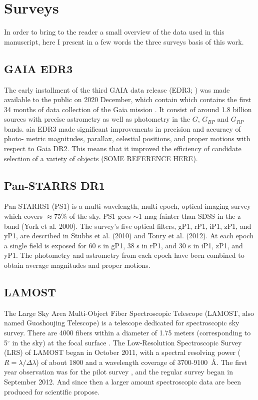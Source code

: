 \documentclass[fleqn,usenatbib]{mnras}
\begin{document}
\section{Surveys}
\label{sec:surveys}

In order to bring to the reader a small overview of the data used
in this manuscript, here I present in a few words the three
surveys basis of this work.

\subsection{GAIA EDR3}
\label{sec:gaia}

The early installment of the third
GAIA data release (EDR3; \citealp{Brown:2021}) was made available to the public
on 2020 December, which contain which contains the first 34 months
of data collection of the Gaia mission \citep{Brown:2018}.
It consist of around 1.8 billion sources
with precise astrometry as well as photometry in
the $G$, $G_{BP}$ and $G_{RP}$ bands. aia EDR3 made
significant improvements in precision and accuracy of photo-
metric magnitudes, parallax, celestial positions, and proper
motions with respect to Gaia DR2. This means that it improved
the efficiency of candidate selection of a variety of
objects (SOME REFERENCE HERE).

\subsection{Pan-STARRS DR1}
\label{sec:PS1}

Pan-STARRS1 (PS1)
is a multi-wavelength, multi-epoch, optical imaging survey
which covers $\approx$75\% of the sky. PS1 goes $\sim$1 mag fainter
than SDSS in the z band (York et al. 2000). The survey’s five optical
filters, gP1, rP1, iP1, zP1, and yP1, are described in Stubbs et al.
(2010) and Tonry et al. (2012). At each epoch a single field
is exposed for 60 s in gP1, 38 s in rP1, and 30 s in iP1, zP1,
and yP1. The photometry and astrometry from each epoch
have been combined to obtain average magnitudes and proper
motions.

\subsection{LAMOST}
\label{sec:lamost}

The Large Sky Area Multi-Object Fiber Spectroscopic Telescope
(LAMOST, also named Guoshoujing Telescope) is a
telescope dedicated for spectroscopic sky survey.
There are 4000 fibers within a diameter of 1.75 meters (corresponding
to 5$^{\circ}$ in the sky) at the focal surface \citep{Cui:2012}.
The Low-Resolution Spectroscopic Survey (LRS) of LAMOST
began in October 2011, with a spectral resolving power ($R = \lambda/\Delta\lambda$)
of about 1800 and a wavelength coverage of
3700-9100~\AA \citep{Zhao:2012}. The first year observation was
for the pilot survey \citep{Luo:2012, Zhao:2012},
and the regular survey began in September 2012. And since then
a larger amount  spectroscopic data are been produced for
scientific propose.
\end{document}
